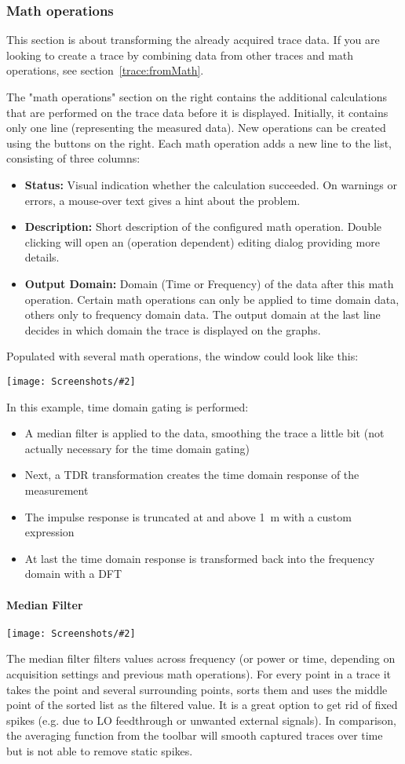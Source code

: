 \documentclass[a4paper,11pt]{article}
\newcommand\info[1][5ex]{%
  \renewcommand\stacktype{L}%
  \scaleto{\stackon[1.2pt]{\color{blue}$\bigcirc$}{\raisebox{-1.5pt}{\small i}}}{#1}%
}
\newenvironment{information}[1][]{%
   \begin{mdframed}[%
      backgroundcolor={blue!15}, hidealllines=true,
      skipabove=0.7\baselineskip, skipbelow=0.7\baselineskip,
      splitbottomskip=2pt, splittopskip=4pt, #1]%
   \makebox[0pt]{%
      \smash{%
         \hspace*{-45pt}%
         \raisebox{-5pt}{%
            {\info}%
         }%
      }%
   }%
}{\end{mdframed}}
\newcommand{\screenshot}[2]{\begin{center}
\texttt{[image: Screenshots/\#2]}
\end{center}}
\begin{document}
\subsubsection{Math operations}
\label{trace:math}
\begin{information}
This section is about transforming the already acquired trace data. If you are looking to create a trace by combining data from other traces and math operations, see section~\ref{trace:fromMath}.
\end{information}
The "math operations" section on the right contains the additional calculations that are performed on the trace data before it is displayed. Initially, it contains only one line (representing the measured data). New operations can be created using the buttons on the right. Each math operation adds a new line to the list, consisting of three columns:
\begin{itemize}
\item \textbf{Status:} Visual indication whether the calculation succeeded. On warnings or errors, a mouse-over text gives a hint about the problem.
\item \textbf{Description:} Short description of the configured math operation. Double clicking will open an (operation dependent) editing dialog providing more details.
\item \textbf{Output Domain:} Domain (Time or Frequency) of the data after this math operation. Certain math operations can only be applied to time domain data, others only to frequency domain data. The output domain at the last line decides in which domain the trace is displayed on the graphs.
\end{itemize}
Populated with several math operations, the window could look like this:
\screenshot{1.0}{TraceMath.png}
In this example, time domain gating is performed:
\begin{itemize}
\item A median filter is applied to the data, smoothing the trace a little bit (not actually necessary for the time domain gating)
\item Next, a TDR transformation creates the time domain response of the measurement
\item The impulse response is truncated at and above \SI{1}{\meter} with a custom expression
\item At last the time domain response is transformed back into the frequency domain with a DFT
\end{itemize}

\paragraph{Median Filter}
\screenshot{0.4}{MathOpMedianFilter.png}
The median filter filters values across frequency (or power or time, depending on acquisition settings and previous math operations). For every point in a trace it takes the point and several surrounding points, sorts them and uses the middle point of the sorted list as the filtered value. It is a great option to get rid of fixed spikes (e.g. due to LO feedthrough or unwanted external signals). In comparison, the averaging function from the toolbar will smooth captured traces over time but is not able to remove static spikes.
\end{document}
